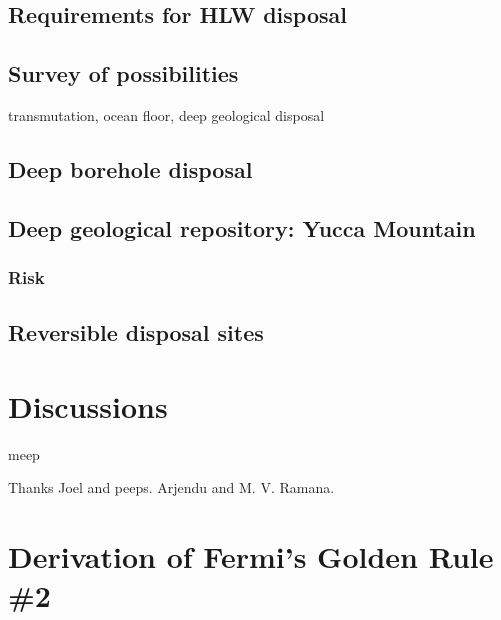 \documentclass[nofootinbib,preprint,aip,pra]{revtex4-1}
\begin{document}
    \subsection{Requirements for HLW disposal}
    \subsection{Survey of possibilities}
    transmutation, ocean floor, deep geological disposal
    \subsection{Deep borehole disposal}
        \subsection{Deep geological repository: Yucca Mountain}
        \subsubsection{Risk}
    \subsection{Reversible disposal sites}

\section{Discussions}
meep

\begin{acknowledgments}
Thanks Joel and peeps. Arjendu and M. V. Ramana.
\end{acknowledgments}

\pagebreak


\appendix
\section{Derivation of Fermi's Golden Rule \#2}
\label{a:fermi}
\end{document}
